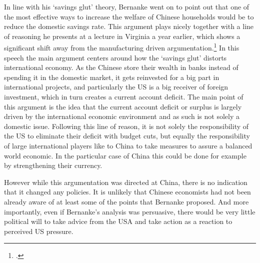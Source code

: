 In line with his `savings glut' theory, Bernanke went on to point out 
that one of the most effective ways to increase the welfare of Chinese 
households would be to reduce the domestic savings rate. This argument 
plays nicely together with a line of reasoning he presents at a lecture 
in Virginia a year earlier, which shows a significant shift away from 
the manufacturing driven argumentation.\footnote{\cite{Bernanke2005}.} 
In this speech the main argument centers around how the `savings glut' 
distorts international economy.  As the Chinese store their wealth in 
banks instead of spending it in the domestic market, it gets reinvested 
for a big part in international projects, and particularly the US is a 
big receiver of foreign investment, which in turn creates a current 
account deficit.  The main point of this argument is the idea that the 
current account deficit or surplus is largely driven by the 
international economic environment and as such is not solely a domestic 
issue. Following this line of reason, it is not solely the 
responsibility of the US to eliminate their deficit with budget cuts, 
but equally the responsibility of large international players like to 
China to take measures to assure a balanced world economic. In the 
particular case of China this could be done for example by strengthening 
their currency.

However while this argumentation was directed at China, there is no 
indication that it changed any policies. It is unlikely that Chinese 
economists had not been already aware of at least some of the points that 
Bernanke proposed. And more importantly, even if Bernanke's analysis was persuasive, there would be very little 
political will to take advice from the USA and take action as a reaction to perceived US pressure.


